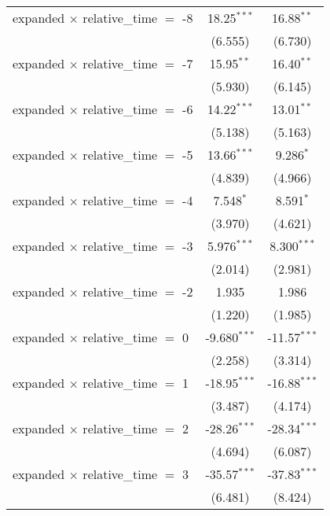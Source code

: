 \begin{tabular}{lcc}
   expanded $\times$ relative\_time $=$ -8    & 18.25$^{***}$  & 16.88$^{**}$\\   
                                              & (6.555)        & (6.730)\\   
   expanded $\times$ relative\_time $=$ -7    & 15.95$^{**}$   & 16.40$^{**}$\\   
                                              & (5.930)        & (6.145)\\   
   expanded $\times$ relative\_time $=$ -6    & 14.22$^{***}$  & 13.01$^{**}$\\   
                                              & (5.138)        & (5.163)\\   
   expanded $\times$ relative\_time $=$ -5    & 13.66$^{***}$  & 9.286$^{*}$\\   
                                              & (4.839)        & (4.966)\\   
   expanded $\times$ relative\_time $=$ -4    & 7.548$^{*}$    & 8.591$^{*}$\\   
                                              & (3.970)        & (4.621)\\   
   expanded $\times$ relative\_time $=$ -3    & 5.976$^{***}$  & 8.300$^{***}$\\   
                                              & (2.014)        & (2.981)\\   
   expanded $\times$ relative\_time $=$ -2    & 1.935          & 1.986\\   
                                              & (1.220)        & (1.985)\\   
   expanded $\times$ relative\_time $=$ 0     & -9.680$^{***}$ & -11.57$^{***}$\\   
                                              & (2.258)        & (3.314)\\   
   expanded $\times$ relative\_time $=$ 1     & -18.95$^{***}$ & -16.88$^{***}$\\   
                                              & (3.487)        & (4.174)\\   
   expanded $\times$ relative\_time $=$ 2     & -28.26$^{***}$ & -28.34$^{***}$\\   
                                              & (4.694)        & (6.087)\\   
   expanded $\times$ relative\_time $=$ 3     & -35.57$^{***}$ & -37.83$^{***}$\\   
                                              & (6.481)        & (8.424)\\   

\end{tabular}
